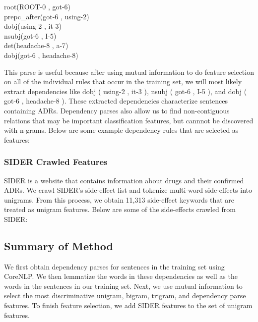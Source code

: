 \documentclass{acm_proc_article-sp}
\begin{document}
root(ROOT-0 , got-6) \\
prepc\_after(got-6 , using-2) \\
dobj(using-2 , it-3) \\ 
nsubj(got-6 , I-5) \\
det(headache-8 , a-7) \\
dobj(got-6 , headache-8) 

This parse is useful because after using mutual information to do feature selection on all of the individual rules that occur in the training set, we will most likely extract dependencies like dobj ( using-2 , it-3 ), nsubj ( got-6 , I-5 ), and dobj ( got-6 , headache-8 ). These extracted dependencies characterize sentences containing ADRs. Dependency parses also allow us to find non-contiguous relations that may be important classification features, but cannnot be discovered with n-grams. Below are some example dependency rules that are selected as features:

\noindent{}

\subsubsection{SIDER Crawled Features}
SIDER is a website that contains information about drugs and their confirmed ADRs. We crawl SIDER's side-effect list and tokenize multi-word side-effects into unigrams. From this process, we obtain 11,313 side-effect keywords that are treated as unigram features. Below are some of the side-effects crawled from SIDER:

\noindent{}

\subsection{Summary of Method}
We first obtain dependency parses for sentences in the training set using CoreNLP. We then lemmatize the words in these dependencies as well as the words in the sentences in our training set. Next, we use mutual information to select the most discriminative unigram, bigram, trigram, and dependency parse features. To finish feature selection, we add SIDER features to the set of unigram features. 
\end{document}
